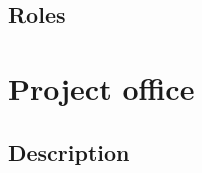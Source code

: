 \documentclass[notitlepage]{article}
\begin{document}
\begin{flushleft}
\subsection{Roles}

\section{Project office}

\subsection{Description}

\end{flushleft}
\end{document}
